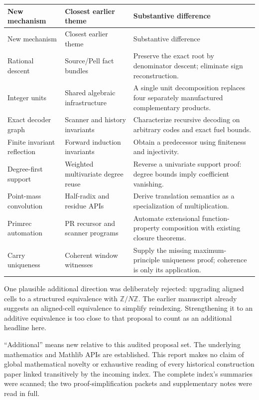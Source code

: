 \documentclass[11pt,letterpaper]{article}
\begin{document}
\begin{longtable}{@{}P{0.22\textwidth}P{0.31\textwidth}P{0.40\textwidth}@{}}
\toprule
New mechanism & Closest earlier theme & Substantive difference\\\midrule
\endfirsthead
\toprule New mechanism & Closest earlier theme & Substantive difference\\\midrule
\endhead
Rational descent & Source/Pell fact bundles & Preserve the exact root by denominator descent; eliminate sign reconstruction.\\
Integer units & Shared algebraic infrastructure & A single unit decomposition replaces four separately manufactured complementary products.\\
Exact decoder graph & Scanner and history invariants & Characterize recursive decoding on arbitrary codes and exact fuel bounds.\\
Finite invariant reflection & Forward induction invariants & Obtain a predecessor using finiteness and injectivity.\\
Degree-first support & Weighted multivariate degree reuse & Reverse a univariate support proof: degree bounds imply coefficient vanishing.\\
Point-mass convolution & Half-radix and residue APIs & Derive translation semantics as a specialization of multiplication.\\
Primrec automation & PR recursor and scanner programs & Automate extensional function-property composition with existing closure theorems.\\
Carry uniqueness & Coherent window witnesses & Supply the missing maximum-principle uniqueness proof; coherence is only its application.\\
\bottomrule
\end{longtable}

One plausible additional direction was deliberately rejected: upgrading aligned cells to a structured equivalence with \(\mathbb Z/N\mathbb Z\). The earlier manuscript already suggests an aligned-cell equivalence to simplify reindexing. Strengthening it to an additive equivalence is too close to that proposal to count as an additional headline here.

``Additional'' means new relative to this audited proposal set. The underlying mathematics and Mathlib APIs are established. This report makes no claim of global mathematical novelty or exhaustive reading of every historical construction paper linked transitively by the incoming index. The complete index's summaries were scanned; the two proof-simplification packets and supplementary notes were read in full.
\end{document}
